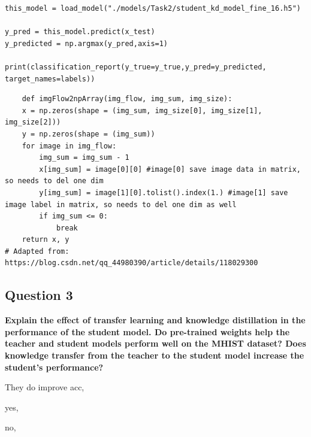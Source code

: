 \documentclass[conference]{IEEEtran}
\begin{document}
\begin{lstlisting}
this_model = load_model("./models/Task2/student_kd_model_fine_16.h5")

y_pred = this_model.predict(x_test)
y_predicted = np.argmax(y_pred,axis=1)

print(classification_report(y_true=y_true,y_pred=y_predicted, target_names=labels))
\end{lstlisting}

\begin{lstlisting}
	def imgFlow2npArray(img_flow, img_sum, img_size):
    x = np.zeros(shape = (img_sum, img_size[0], img_size[1], img_size[2]))
    y = np.zeros(shape = (img_sum))
    for image in img_flow:
        img_sum = img_sum - 1
        x[img_sum] = image[0][0] #image[0] save image data in matrix, so needs to del one dim
        y[img_sum] = image[1][0].tolist().index(1.) #image[1] save image label in matrix, so needs to del one dim as well
        if img_sum <= 0:
            break
    return x, y
# Adapted from: https://blog.csdn.net/qq_44980390/article/details/118029300
\end{lstlisting}

\subsection{Question 3} \textbf{Explain the effect of transfer learning and knowledge distillation in the performance of the student model. Do pre-trained weights help the teacher and student models perform well on the MHIST dataset? Does knowledge transfer from the teacher to the student model increase the student’s performance?}

They do improve acc,

yes,

no,
\end{document}
